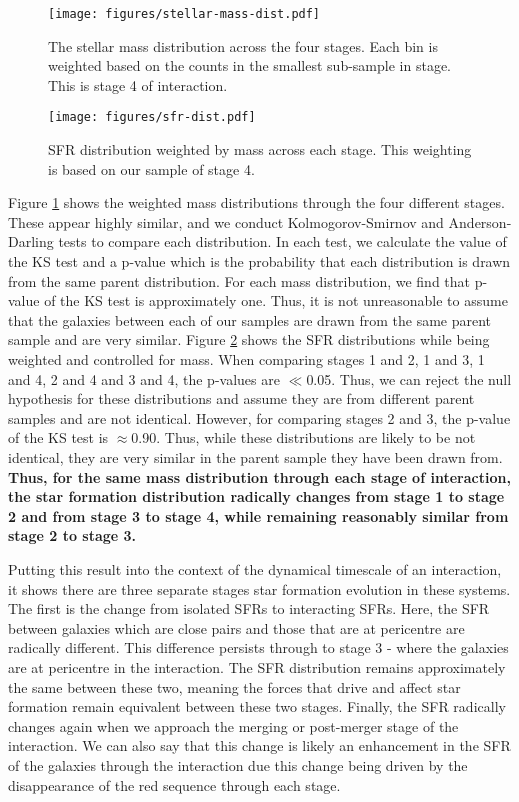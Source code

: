 \documentclass[fleqn,usenatbib]{mnras}
\begin{document}
\begin{figure}
    \centering
    \texttt{[image: figures/stellar-mass-dist.pdf]}
    \caption{The stellar mass distribution across the four stages. Each bin is weighted based on the counts in the smallest sub-sample in stage. This is stage 4 of interaction.}
    \label{fig:weighted-mass}
\end{figure}

\begin{figure}
    \centering
    \texttt{[image: figures/sfr-dist.pdf]}
    \caption{SFR distribution weighted by mass across each stage. This weighting is based on our sample of stage 4.}
    \label{fig:weighted-sfr}
\end{figure}

Figure \ref{fig:weighted-mass} shows the weighted mass distributions through the four different stages. These appear highly similar, and we conduct Kolmogorov-Smirnov \citep[KS-test;][]{an1933sulla} and Anderson-Darling \citep[AD-test;][]{stephens_74} tests to compare each distribution. In each test, we calculate the value of the KS test and a p-value which is the probability that each distribution is drawn from the same parent distribution. For each mass distribution, we find that p-value of the KS test is approximately one. Thus, it is not unreasonable to assume that the galaxies between each of our samples are drawn from the same parent sample and are very similar. Figure \ref{fig:weighted-sfr} shows the SFR distributions while being weighted and controlled for mass. When comparing stages 1 and 2, 1 and 3, 1 and 4, 2 and 4 and 3 and 4, the p-values are $\ll$0.05. Thus, we can reject the null hypothesis for these distributions and assume they are from different parent samples and are not identical. However, for comparing stages 2 and 3, the p-value of the KS test is $\approx$0.90. Thus, while these distributions are likely to be not identical, they are very similar in the parent sample they have been drawn from. \textbf{Thus, for the same mass distribution through each stage of interaction, the star formation distribution radically changes from stage 1 to stage 2 and from stage 3 to stage 4, while remaining reasonably similar from stage 2 to stage 3.}

Putting this result into the context of the dynamical timescale of an interaction, it shows there are three separate stages star formation evolution in these systems. The first is the change from isolated SFRs to interacting SFRs. Here, the SFR between galaxies which are close pairs and those that are at pericentre are radically different. This difference persists through to stage 3 - where the galaxies are at pericentre in the interaction. The SFR distribution remains approximately the same between these two, meaning the forces that drive and affect star formation remain equivalent between these two stages. Finally, the SFR radically changes again when we approach the merging or post-merger stage of the interaction. We can also say that this change is likely an enhancement in the SFR of the galaxies through the interaction due this change being driven by the disappearance of the red sequence through each stage.
\end{document}
